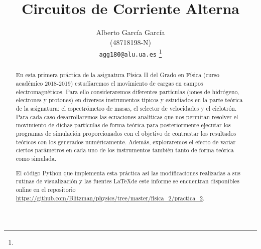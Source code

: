 \documentclass[journal]{IEEEtran}
\begin{document}
%
\title{Circuitos de Corriente Alterna}
%
%
%

\author{Alberto García García\\ (48718198-N)\\ \texttt{agg180@alu.ua.es} %
\thanks{}%
}


%
{}
% 


\maketitle

\begin{abstract}
En esta primera práctica de la asignatura Física II del Grado en Física (curso académico 2018-2019) estudiaremos el movimiento de cargas en campos electromagnéticos. Para ello consideraremos diferentes partículas (iones de hidrógeno, electrones y protones) en diversos instrumentos típicos y estudiados en la parte teórica de la asignatura: el espectrómetro de masas, el selector de velocidades y el ciclotrón. Para cada caso desarrollaremos las ecuaciones analíticas que nos permitan resolver el movimiento de dichas partículas de forma teórica para posteriormente ejecutar los programas de simulación proporcionados con el objetivo de contrastar los resultados teóricos con los generados numéricamente. Además, exploraremos el efecto de variar ciertos parámetros en cada uno de los instrumentos también tanto de forma teórica como simulada.

El código Python que implementa esta práctica así las modificaciones realizadas a sus rutinas de visualización y las fuentes \LaTeX de este informe se encuentran disponibles online en el repositorio \url{https://github.com/Blitzman/physics/tree/master/fisica_2/practica_2}.
\end{abstract}
\end{document}
